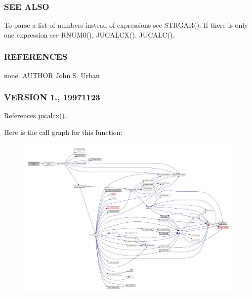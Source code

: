 \subsubsection*{S\+EE A\+L\+SO}

To parse a list of numbers instead of expressions see S\+T\+R\+G\+A\+R(). If there is only one expression see R\+N\+U\+M0(), J\+U\+C\+A\+L\+C\+X(), J\+U\+C\+A\+L\+C().

\subsubsection*{R\+E\+F\+E\+R\+E\+N\+C\+ES}

none. A\+U\+T\+H\+OR John S. Urban \subsubsection*{V\+E\+R\+S\+I\+ON 1., 19971123}

References jucalcx().

Here is the call graph for this function\+:
\nopagebreak
\begin{figure}[H]
\begin{center}
\leavevmode
\includegraphics[width=350pt]{namespacem__calculator__plus_a4d3424e0cb74d4af53e7f59c07d31f1b_cgraph}
\end{center}
\end{figure}
